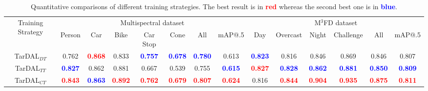 \documentclass[10pt,twocolumn,letterpaper]{article}
\begin{document}
\begin{table*}[!htb]
	\centering
	\renewcommand\arraystretch{1.1} 
	\setlength{\tabcolsep}{1.6mm}
	\begin{tabular}{|c|cccccc|c|ccccc|c|}
		\hline
		\multirow{2}{*}{\footnotesize Training Strategy}&\multicolumn{7}{c|}{\footnotesize Multispectral dataset}&\multicolumn{6}{c|}{\footnotesize M$^3$FD dataset}\\
		\cline{2-14} 
		~&\footnotesize Person&\footnotesize Car&\footnotesize Bike&\footnotesize Car Stop 
		&\footnotesize Cone &\footnotesize All&\footnotesize mAP@.5&\footnotesize Day&\footnotesize Overcast&\footnotesize Night&\footnotesize Challenge&\footnotesize All&\footnotesize mAP@.5\\
		
		\hline
		\footnotesize TarDAL$_{DT}$&\footnotesize 0.762&\footnotesize\textcolor{red}{\textbf{0.868}}&\footnotesize 0.833&\footnotesize  \textcolor{blue}{\textbf{0.757}} &\footnotesize \textcolor{blue}{\textbf{0.678}}&\footnotesize \textcolor{blue}{\textbf{0.780}}&\footnotesize 0.613&\footnotesize \textcolor{blue}{\textbf{0.823}}&\footnotesize 0.816&\footnotesize 0.846&\footnotesize 0.869 &\footnotesize 0.846&\footnotesize 0.807\\
		\hline 
		
		\footnotesize TarDAL$_{TT}$&\footnotesize \textcolor{blue}{\textbf{0.827}}&\footnotesize 0.862&\footnotesize 0.881&\footnotesize 0.667&\footnotesize  0.539&\footnotesize 0.755&\footnotesize \textcolor{blue}{\textbf{0.615}}&\footnotesize \textcolor{red}{\textbf{0.827}}&\footnotesize \textcolor{blue}{\textbf{0.828}}&\footnotesize \textcolor{blue}{\textbf{0.862}}&\footnotesize \textcolor{blue}{\textbf{0.881}}&\footnotesize \textcolor{blue}{\textbf{0.850}}&\footnotesize \textcolor{blue}{\textbf{0.809}}\\
		\hline 
		
		\footnotesize TarDAL$_{CT}$&\footnotesize \textcolor{red}{\textbf{0.843}}&\footnotesize \textcolor{blue}{\textbf{0.863}}&\footnotesize \textcolor{red}{\textbf{0.892}}&\footnotesize \textcolor{red}{\textbf{0.762}} &\footnotesize\textcolor{red}{\textbf{0.679}}&\footnotesize \textcolor{red}{\textbf{0.807}}&\footnotesize \textcolor{red}{\textbf{0.624}}&\footnotesize 0.816&\footnotesize \textcolor{red}{\textbf{0.844}}&\footnotesize \textcolor{red}{\textbf{0.904}}&\footnotesize\textcolor{red}{\textbf{0.935}} &\footnotesize \textcolor{red}{\textbf{0.875}}&\footnotesize \textcolor{red}{\textbf{0.811}}\\
		\hline 
		
		\hline 
	\end{tabular}
	\vspace{-0.2cm}
	\caption{Quantitative comparisons of different training strategies. The best result is in {\textcolor{red}{\textbf{red}}} whereas the second best one is in {\textcolor{blue}{\textbf{blue}}}.}
	\label{tab: training}	
\end{table*}
\end{document}
